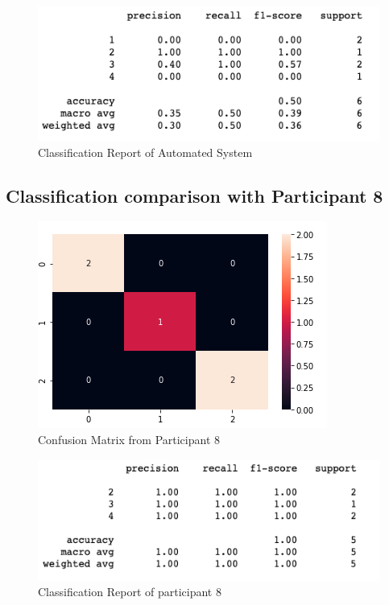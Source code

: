 \begin{figure}[!htp]
    \includegraphics[width=\textwidth]{Images/a7r.png}
    \caption{Classification Report of Automated System}
    \label{fig:f11}
\end{figure}


\pagebreak
\subsection*{Classification comparison with Participant 8}

\begin{figure}[!htp]
    \includegraphics[width=\textwidth]{Images/p8.png}
    \caption{Confusion Matrix from Participant 8}
    \label{fig:f11}
\end{figure}

\begin{figure}[!htp]
    \includegraphics[width=\textwidth]{Images/p8r.png}
    \caption{Classification Report of participant 8}
    \label{fig:f11}
\end{figure}

